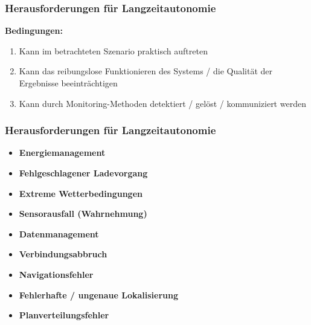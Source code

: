 \documentclass{beamer}
\begin{document}
\begin{frame}
  \frametitle{Herausforderungen für Langzeitautonomie}
  \textbf{Bedingungen:}
  \begin{enumerate}
    \item Kann im betrachteten Szenario praktisch auftreten
    \item Kann das reibungslose Funktionieren des Systems / die Qualität der Ergebnisse beeinträchtigen
    \item Kann durch Monitoring-Methoden detektiert / gelöst / kommuniziert werden
  \end{enumerate}
\end{frame}

\begin{frame}
  \frametitle{Herausforderungen für Langzeitautonomie}
  \begin{itemize}
    \item \textbf{Energiemanagement}
    \item \textbf{Fehlgeschlagener Ladevorgang}
    \item \textbf{Extreme Wetterbedingungen}
    \item \textbf{Sensorausfall (Wahrnehmung)}
    \item \textbf{Datenmanagement}
    \item \textbf{Verbindungsabbruch}
    \item \textbf{Navigationsfehler}
    \item \textbf{Fehlerhafte / ungenaue Lokalisierung}
    \item \textbf{Planverteilungsfehler}
\end{itemize}
\end{frame}



\end{document}
